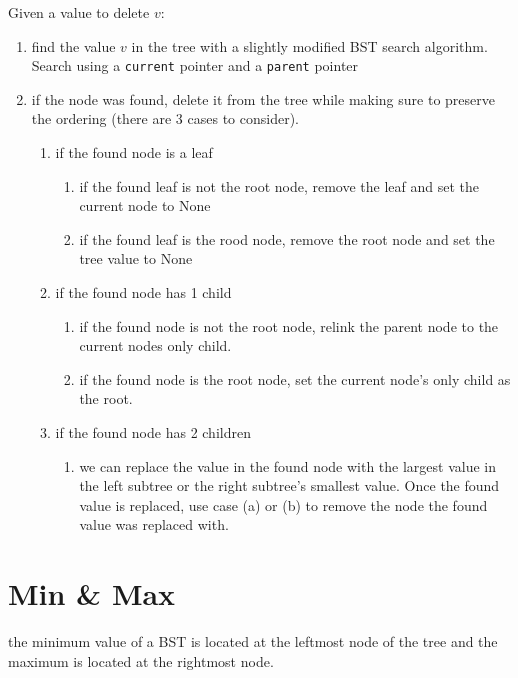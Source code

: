 \documentclass[12pt]{book}
\begin{document}
Given a value to delete $v$:
 \begin{enumerate}
        \item find the value $v$ in the tree with a slightly modified BST search algorithm.
                 Search using a \texttt{current} pointer and a  \texttt{parent} pointer
        \item if the node was found, delete it from the tree while making sure to preserve the ordering (there are 3 cases to consider).
        \begin{enumerate}
                \item if the found node is a leaf
                \begin{enumerate}
                        \item if the found leaf is not the root node, remove the leaf and set the current node to None
                        \item if the found leaf is the rood node, remove the root node and set the tree value to None
                \end{enumerate}
                \item if the found node has 1 child
                \begin{enumerate}
                        \item if the found node is not the root node, relink the parent node to the current nodes only child.
                        \item if the found node is the root node, set the current node's only child as the root.
                \end{enumerate}
                \item if the found node has 2 children
                        \begin{enumerate}
                                \item we can replace the value in the found node with the largest value in the left subtree or the
                                        right subtree's smallest value. 
                                        Once the found value is replaced, use case (a) or (b) to remove the node the
                                        found value was replaced with.
                        \end{enumerate}
        \end{enumerate}
\end{enumerate}

\section*{Min \& Max}
the minimum value of a BST is located at the leftmost node of the tree and the maximum is located at the rightmost node.
\end{document}
